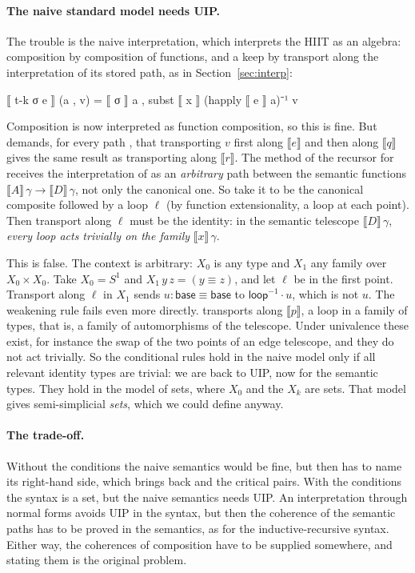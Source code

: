 \documentclass[11pt]{article}
\newcommand{\ag}[1]{\texttt{\detokenize{#1}}}
\begin{document}
\paragraph{The naive standard model needs UIP.}
The trouble is the naive interpretation, which interprets the HIIT as an
algebra: composition by composition of functions, and a keep by transport
along the interpretation of its stored path, as in
Section~\ref{sec:interp}:
\begin{agda}
⟦ t-k σ e ⟧ (a , v) = ⟦ σ ⟧ a , subst ⟦ x ⟧ (happly ⟦ e ⟧ a)⁻¹ v
\end{agda}
Composition is now interpreted as function composition, so this is fine. But
\ag{t-k∘t-k r} demands, for every path \ag{r}, that transporting $v$ first
along $\llbracket e\rrbracket$ and then along $\llbracket q\rrbracket$ gives the
same result as transporting along $\llbracket r\rrbracket$. The method of
the recursor for \ag{t-k∘t-k} receives the interpretation of \ag{r} as an
\emph{arbitrary} path between the semantic functions
$\llbracket A\rrbracket\,\gamma\to\llbracket D\rrbracket\,\gamma$, not only the
canonical one. So take it to be the canonical composite followed by a loop
$\ell$ (by function extensionality, a loop at each point). Then transport along $\ell$ must be the identity: in the semantic
telescope $\llbracket D\rrbracket\,\gamma$, \emph{every loop acts trivially on
the family} $\llbracket x\rrbracket\,\gamma$.

This is false. The context is arbitrary: $X_0$ is any type and $X_1$ any family
over $X_0\times X_0$. Take $X_0 = S^1$ and $X_1\,y\,z = (y \equiv z)$, and let
$\ell$ be \ag{loop} in the first point. Transport along $\ell$ in $X_1$ sends
$u : \mathsf{base}\equiv\mathsf{base}$ to $\mathsf{loop}^{-1}\cdot u$, which is not
$u$. The weakening rule fails even more directly. \ag{⟦ suc x p ⟧} transports
along $\llbracket p\rrbracket$, a loop in a family of types, that is, a family of
automorphisms of the telescope. Under univalence these exist, for instance the
swap of the two points of an edge telescope, and they do not act trivially. So
the conditional rules hold in the naive model only if all relevant identity
types are trivial: we are back to UIP, now for the semantic types. They hold
in the model of sets, where $X_0$ and the $X_k$ are sets. That model gives
semi-simplicial \emph{sets}, which we could define anyway.

\paragraph{The trade-off.}
Without the conditions the naive semantics would be fine, but then
\ag{t-k∘t-k} has to name its right-hand side, which brings back \ag{ass} and
the critical pairs. With the conditions the syntax is a set, but the naive
semantics needs UIP. An interpretation through normal forms avoids UIP in the
syntax, but then the coherence of the semantic paths has to be proved in the
semantics, as for the inductive-recursive syntax. Either way, the coherences
of composition have to be supplied somewhere, and stating them is the
original problem.
\end{document}
